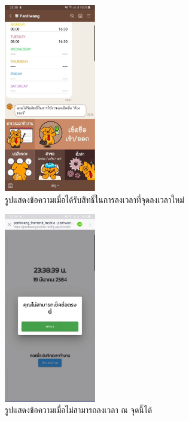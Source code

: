\begin{figure}
  \begin{center}
    \includegraphics[width=4cm,keepaspectratio]{./images/added_location.jpg}
  \end{center}
  \caption[รูปแสดงข้อความเมื่อได้รับสิทธิ์ในการลงเวลาที่จุดลงเวลาใหม่]{รูปแสดงข้อความเมื่อได้รับสิทธิ์ในการลงเวลาที่จุดลงเวลาใหม่} 
  \label{fig:added_location}
\end{figure}

\begin{figure}
  \begin{center}
    \includegraphics[width=4cm,keepaspectratio]{./images/cant_clock.jpg}
  \end{center}
  \caption[รูปแสดงข้อความเมื่อไม่สามารถลงเวลา ณ จุดนี้ได้]{รูปแสดงข้อความเมื่อไม่สามารถลงเวลา ณ จุดนี้ได้} 
  \label{fig:cant_clock}
\end{figure}
 
